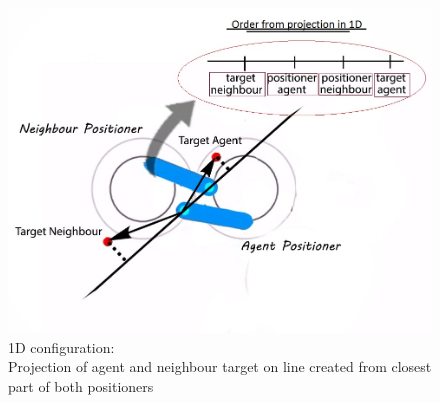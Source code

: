 \documentclass[]{spie}  %
\begin{document}
	\begin{figure}[H]
		\centering
		\includegraphics[scale=0.4]{images/Projection1.jpg}
		\caption{\centering 1D configuration:\\
			 Projection of agent and neighbour target on line created from closest part of both positioners}
		\label{projection}
	\end{figure}
	
\end{document}
